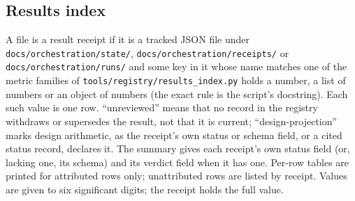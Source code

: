 \documentclass[11pt]{article}
\begin{document}


\subsection{Results index}
\label{sec:rix-index}
A file is a result receipt if it is a tracked JSON file under \texttt{docs/orchestration/state/},
\texttt{docs/orchestration/receipts/} or \texttt{docs/orchestration/runs/} and some key in it whose name matches one
of the metric families of \texttt{tools/registry/results\_index.py} holds a number, a list of numbers or an object
of numbers (the exact rule is the script's docstring). Each such value is one row. ``unreviewed'' means that no
record in the registry withdraws or supersedes the result, not that it is current; ``design-projection'' marks
design arithmetic, as the receipt's own status or schema field, or a cited status record, declares it. The summary
gives each receipt's own status field (or, lacking one, its schema) and its verdict field when it has one. Per-row
tables are printed for attributed rows only; unattributed rows are listed by receipt. Values are given to six significant digits; the receipt holds the full value.



\printbibliography
\end{document}
